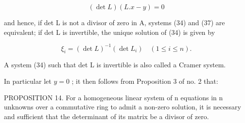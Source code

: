 \[
(\det L) (L. x - y) = 0\tag{38}
\]

and hence, if det L is not a divisor of zero in A, systems (34) and (37) are equivalent; if det L is invertible, the unique solution of (34) is given by

\[
\xi_ {i} = (\det L) ^ {- 1} (\det L _ {i}) \quad (1 \leqslant i \leqslant n).\tag{39}
\]

A system (34) such that det L is invertible is also called a Cramer system.

In particular let \(y = 0\) ; it then follows from Proposition 3 of no. 2 that:

PROPOSITION 14. For a homogeneous linear system of n equations in n unknowns over a commutative ring to admit a non-zero solution, it is necessary and sufficient that the determinant of its matrix be a divisor of zero.

